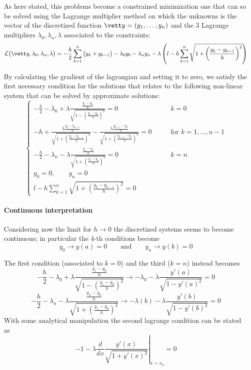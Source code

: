 	As here stated, this problems become a constrained minimization one that can so be solved using the Lagrange multiplier method on which the unknowns is the vector of the discretized function $\vett y = (y_1,\dots, y_n)$ and the 3 Lagrange multipliers $\lambda_0,\lambda_n,\lambda$ associated to the constraints:
	\[ \mathcal L \big(\vett y,\lambda_0,\lambda_n,\lambda\big) = - \frac h 2 \sum_{k=1}^{n} \big(y_k + y_{k-1}\big) - \lambda_0y_0 - \lambda_ny_n - \lambda \left( l - h \sum_{k=1}^{n} \sqrt{1 + \left( \frac{y_k - y_{k-1}}{h} \right)^2} \right) \]
	
	By calculating the gradient of the lagrangian and setting it to zero, we satisfy the first necessary condition for the solutions that relates to the following non-linear system that can be solved by approximate solutions:
	\[ \begin{cases}
		- \frac{h}{2} - \lambda_0 + \lambda \frac{ \frac{y_1-y_0}{h} }{\sqrt{1- \left( \frac{y_1-y_0}{h} \right)^2}} = 0 & k = 0 \\
		-h + \frac{\lambda \frac{y_k-y_{k+1}}{h}}{\sqrt{1+\left( \frac{y_k - y_{k-1}}{h} \right)^2}} - \frac{\lambda \frac{y_{k+1}-y_{k}}{h}}{\sqrt{1+\left( \frac{y_{k+1} - y_{k}}{h} \right)^2}} = 0 \qquad& \textrm{for } k = 1,\dots,n-1 \\
		- \frac h 2 - \lambda_n - \lambda \frac{\frac{y_n - y_0}{h}}{\sqrt{1 + \left( \frac{y_1-y_0}{h} \right)^2}} = 0 & k = n \\
		y_0 = 0,\qquad y_n = 0 \\ 
		l-h\sum_{k=1}^{n} \sqrt{1 + \left( \frac{y_k - y_{k-1}}{h} \right)^2} = 0
	\end{cases} \]
	
	\paragraph{Continuous interpretation} Considering now the limit for $h\rightarrow 0$ the discretized systems seems to become continuous; in particular the 4-th conditions become
	\[ y_0 \rightarrow y(a) = 0 \qquad \textrm{and} \qquad y_n \rightarrow y(b) = 0 \]
	
	The first condition (associated to $k=0$) and the third ($k = n$) instead becomes
	\[ - \frac{h}{2} - \lambda_0 + \lambda \frac{ \frac{y_1-y_0}{h} }{\sqrt{1- \left( \frac{y_1-y_0}{h} \right)^2}} \rightarrow - \lambda_0 - \lambda \frac{y'(a)}{\sqrt{1-y'(a)^2}} = 0  \]
	\[ - \frac h 2 - \lambda_n - \lambda \frac{\frac{y_n - y_0}{h}}{\sqrt{1 + \left( \frac{y_1-y_0}{h} \right)^2}} \rightarrow  - \lambda(b) - \lambda \frac{y'(b)}{\sqrt{1-y'(b)^2}} = 0 \]
	With some analytical manipulation the second lagrange condition can be stated as
	\[ - 1 - \lambda \frac{d}{dx} \left. \frac{y'(x)}{\sqrt{1+y'(x)^2}} \right|_{x=x_k} = 0  \]
	
